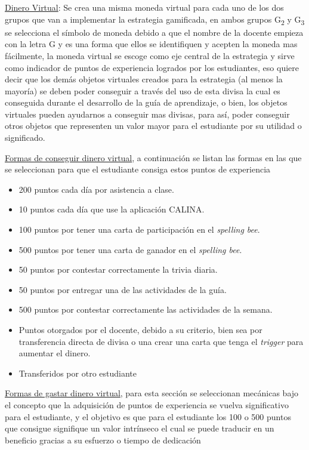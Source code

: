 \uline{Dinero Virtual}: Se crea una misma moneda virtual para cada uno de los dos grupos que van a implementar 
la estrategia gamificada, en ambos grupos G\textsubscript{2} y G\textsubscript{3} se selecciona el símbolo de 
moneda  debido a que el nombre de la docente empieza con la 
letra G y es una forma que ellos se identifiquen y acepten la moneda mas fácilmente, la moneda virtual se 
escoge como eje central de la estrategia y sirve como indicador de puntos de experiencia logrados por los 
estudiantes, eso quiere decir que los demás objetos virtuales creados para la estrategia (al menos la mayoría) 
se deben poder conseguir a través del uso de esta divisa la cual es conseguida durante el desarrollo de la 
guía de aprendizaje, o bien, los objetos virtuales pueden ayudarnos a conseguir mas divisas, para así, 
poder conseguir otros objetos que representen un valor mayor para el estudiante por su utilidad o significado.

\uline{Formas de conseguir dinero virtual}, a continuación se listan las formas en las que se seleccionan para 
que el estudiante consiga estos puntos de experiencia

\begin{itemize}
	\item 200 puntos cada día por asistencia a clase.
	\item 10 puntos cada día que use la aplicación CALINA.
	\item 100 puntos por tener una carta de participación en el \textit{spelling bee}.
	\item 500 puntos por tener una carta de ganador en el \textit{spelling bee}.
	\item 50 puntos por contestar correctamente la trivia diaria.
	\item 50 puntos por entregar una de las actividades de la guía.
	\item 500 puntos por contestar correctamente las actividades de la semana.
	\item Puntos otorgados por el docente, debido a su criterio, bien sea por transferencia directa de 
		divisa o una crear una carta que tenga el \textit{trigger} para aumentar el dinero.
	\item Transferidos por otro estudiante
\end{itemize}

\uline{Formas de gastar dinero virtual}, para esta sección se seleccionan mecánicas bajo el concepto que la 
adquisición de puntos de experiencia se vuelva significativo para el estudiante, y el objetivo es que para 
el estudiante los 100 o 500 puntos que consigue signifique un valor intrínseco el cual se puede traducir en un 
beneficio gracias a su esfuerzo o tiempo de dedicación

